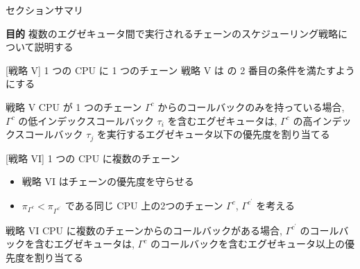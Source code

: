 \begin{frame}{セクションサマリ}
    \begin{itembox}[l]{\textbf{目的}}
        複数のエグゼキュータ間で実行されるチェーンのスケジューリング戦略について説明する
    \end{itembox}
\end{frame}


\begin{frame}{[戦略 V] 1 つの CPU に 1 つのチェーン}
    戦略 V は  の 2 番目の条件を満たすようにする
    \begin{block}{戦略 V}
        CPU が 1 つのチェーン $\Gamma^{c}$ からのコールバックのみを持っている場合, $\Gamma^{c}$ の低インデックスコールバック $\tau_{i}$ を含むエグゼキュータは, $\Gamma^{c}$ の高インデックスコールバック $\tau_{j}$ を実行するエグゼキュータ以下の優先度を割り当てる
    \end{block}
\end{frame}

\begin{frame}{[戦略 VI]  1 つの CPU に複数のチェーン}
    \begin{itemize}
        \item 戦略 VI はチェーンの優先度を守らせる
        \item $\pi_{\Gamma^{c}}<\pi_{\Gamma^{c^{\prime}}}$ である同じ CPU 上の2つのチェーン $\Gamma^{c}$, $\Gamma^{c^{\prime}}$ を考える
    \end{itemize}
    \begin{block}{戦略 VI}
        CPU に複数のチェーンからのコールバックがある場合, $\Gamma^{c^{\prime}}$ のコールバックを含むエグゼキュータは, $\Gamma^{c}$ のコールバックを含むエグゼキュータ以上の優先度を割り当てる
    \end{block}
\end{frame}



